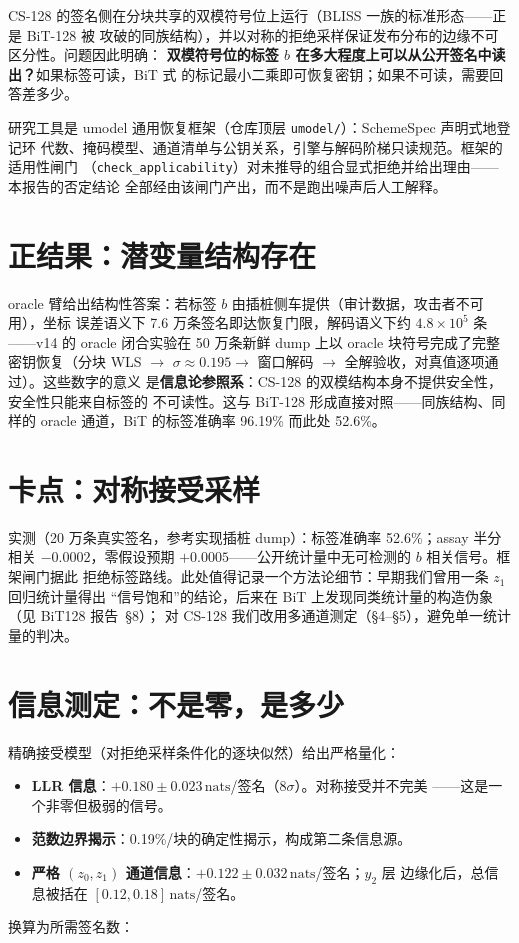 \documentclass[UTF8,11pt,a4paper]{ctexart}
\newcommand{\code}[1]{\texttt{\small #1}}
\newcommand{\nats}{\ensuremath{\,\mathrm{nats}}}
\begin{document}
CS-128 的签名侧在分块共享的双模符号位上运行（BLISS 一族的标准形态——正是 BiT-128 被
攻破的同族结构），并以对称的拒绝采样保证发布分布的边缘不可区分性。问题因此明确：
\textbf{双模符号位的标签 $b$ 在多大程度上可以从公开签名中读出？}如果标签可读，BiT 式
的标记最小二乘即可恢复密钥；如果不可读，需要回答差多少。

研究工具是 umodel 通用恢复框架（仓库顶层 \code{umodel/}）：SchemeSpec 声明式地登记环
代数、掩码模型、通道清单与公钥关系，引擎与解码阶梯只读规范。框架的适用性闸门
（\code{check\_applicability}）对未推导的组合显式拒绝并给出理由——本报告的否定结论
全部经由该闸门产出，而不是跑出噪声后人工解释。

\section{正结果：潜变量结构存在}

oracle 臂给出结构性答案：若标签 $b$ 由插桩侧车提供（审计数据，攻击者不可用），坐标
误差语义下 7.6 万条签名即达恢复门限，解码语义下约 $4.8\times10^5$ 条——v14 的 oracle
闭合实验在 50 万条新鲜 dump 上以 oracle 块符号完成了完整密钥恢复（分块 WLS $\to$
$\sigma \approx 0.195 \to$ 窗口解码 $\to$ 全解验收，对真值逐项通过）。这些数字的意义
是\textbf{信息论参照系}：CS-128 的双模结构本身不提供安全性，安全性只能来自标签的
不可读性。这与 BiT-128 形成直接对照——同族结构、同样的 oracle 通道，BiT 的标签准确率
96.19\% 而此处 52.6\%。

\section{卡点：对称接受采样}

实测（20 万条真实签名，参考实现插桩 dump）：标签准确率 52.6\%；assay 半分相关
$-0.0002$，零假设预期 $+0.0005$——公开统计量中无可检测的 $b$ 相关信号。框架闸门据此
拒绝标签路线。此处值得记录一个方法论细节：早期我们曾用一条 $z_1$ 回归统计量得出
``信号饱和''的结论，后来在 BiT 上发现同类统计量的构造伪象（见 BiT128 报告~\S8）；
对 CS-128 我们改用多通道测定（\S4--\S5），避免单一统计量的判决。

\section{信息测定：不是零，是多少}

精确接受模型（对拒绝采样条件化的逐块似然）给出严格量化：
\begin{itemize}
\item \textbf{LLR 信息}：$+0.180 \pm 0.023$\nats/签名（$8\sigma$）。对称接受并不完美
  ——这是一个非零但极弱的信号。
\item \textbf{范数边界揭示}：0.19\%/块的确定性揭示，构成第二条信息源。
\item \textbf{严格 $(z_0, z_1)$ 通道信息}：$+0.122 \pm 0.032$\nats/签名；$y_2$ 层
  边缘化后，总信息被括在 $[0.12, 0.18]$\nats/签名。
\end{itemize}
换算为所需签名数：
\end{document}
